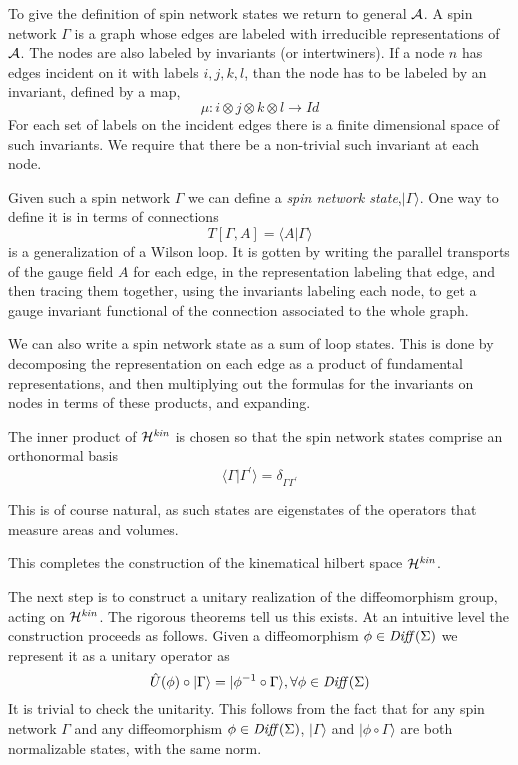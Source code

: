 \documentclass[12pt]{article}
\newcommand{\f}{\begin{equation}}
\newcommand{\ff}{\end{equation}}
\def\Diff{\mathop{\it Diff}}
\begin{document}
To give the definition of spin network states we return to general $\cal A$. 
A spin network $\Gamma$ is a graph whose edges are labeled with 
irreducible representations of $\cal A$.  The nodes are also labeled by 
invariants (or intertwiners). If a node $n$ has edges incident on it 
with labels $i,j,k,l$, than the node has to be labeled by an
invariant, defined by a map,
\f
\mu : i \otimes j \otimes k \otimes l \rightarrow Id
\ff
For each set of labels on the incident edges there is a finite 
dimensional space of such invariants. We require that there be a 
non-trivial such invariant at each node. 

Given such a spin network $\Gamma $ we can define a {\it spin network 
state},$ |\Gamma \rangle $.  One way to define it is in terms of connections
\f
T [\Gamma, A] = \langle A |\Gamma \rangle 
\ff
is a generalization of a Wilson 
loop. It is gotten by writing the parallel 
transports of the gauge field $A$ for each edge, in the representation
labeling that edge, and then tracing them together, using the 
invariants labeling each node, to get a gauge invariant functional of 
the connection associated to the whole graph.  

We can also write a spin network state as a sum  of loop
states. This is done by decomposing the representation on each edge
as a product of fundamental representations, and then multiplying out
the formulas for the invariants on nodes in terms of these products, 
and expanding.  

The inner product of ${\cal H}^{\it kin}$ is chosen so that the spin network states 
comprise an orthonormal basis
\f
\langle\Gamma |\Gamma^\prime \rangle = \delta_{\Gamma \Gamma^\prime}
\ff

This is of course natural, as such states are eigenstates of the operators 
that measure areas and
volumes.

This completes the construction of the kinematical hilbert space
${\cal H}^{\it kin}$.  

The next step is to construct  a unitary realization of the diffeomorphism group, 
acting on ${\cal H}^{\it kin}$.  The rigorous theorems tell us this exists.
At an intuitive level the construction proceeds as follows.   
Given a diffeomorphism $\phi \in \Diff(\Sigma )$  we represent it as
a unitary operator as
\f
\hat{U}(\phi ) \circ |\Gamma \rangle = |\phi^{-1} \circ \Gamma \rangle,  \forall \phi \in \Diff( \Sigma ) 
\ff
It is trivial to check the unitarity. This follows from the fact that for any spin network
$\Gamma$ and any diffeomorphism $\phi \in \Diff( \Sigma )$,  $|\Gamma \rangle$ and
$| \phi \circ \Gamma \rangle$ are both normalizable states, with the same norm.   
\end{document}
